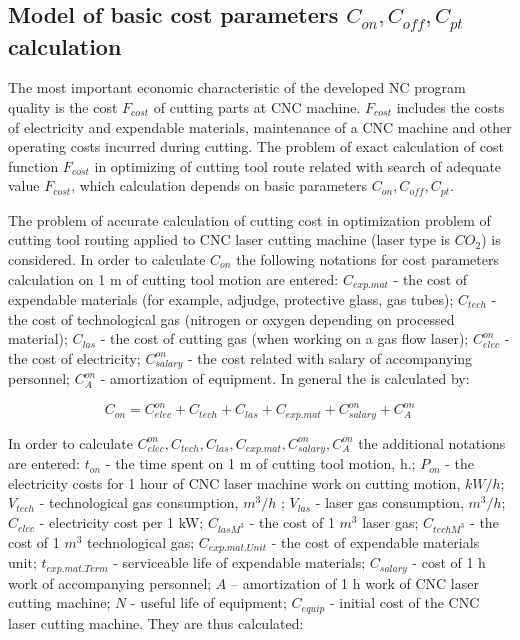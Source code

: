 \documentclass[runningheads]{llncs}
\begin{document}
\subsection{Model of basic cost parameters  $C_{on}, C_{off}, C_{pt}$ calculation}

The most important economic characteristic of the developed NC program quality is the cost $F_{cost}$
of cutting parts at CNC machine.
$F_{cost}$ includes the costs of electricity and expendable materials,
maintenance of a CNC machine and other operating costs incurred during cutting.
The problem of exact calculation of cost function $F_{cost}$
in optimizing of cutting tool route related with search of adequate value  $F_{cost}$,
which calculation depends on basic parameters  $C_{on}, C_{off}, C_{pt}$.

The problem of accurate calculation of cutting cost
in optimization problem of cutting tool routing applied to CNC laser cutting machine
(laser type is $CO_2$)
is considered.
In order to calculate $C_{on}$
the following notations for cost parameters calculation on 1 m of cutting tool motion are entered:
$C_{exp.mat}$ - the cost of expendable materials
(for example, adjudge, protective glass, gas tubes);
$C_{tech}$  - the cost of technological gas
(nitrogen or oxygen depending on processed material);
$C_{las}$ - the cost of cutting gas
(when working on a gas flow laser);
$C^{on}_{elec}$ - the cost of electricity;
$C^{on}_{salary}$ - the cost related with salary of accompanying personnel;
$C^{on}_A$ - amortization of equipment.
In general the  is calculated by:

\begin{equation}
C_{on} =
C^{on}_{elec} + C_{tech} + C_{las} + C_{exp.mat} + C^{on}_{salary} + C^{on}_A
\label{eq1.3}
\end{equation}

In order to calculate
$C^{on}_{elec}, C_{tech}, C_{las}, C_{exp.mat}, C^{on}_{salary}, C^{on}_A$
the additional notations are entered:
$t_{on}$  - the time spent on 1 m of cutting tool motion, h.;
$P_{on}$  - the electricity costs for 1 hour of CNC laser machine work on cutting motion, $kW/h$;
$V_{tech}$  - technological gas consumption, $m^3/h$ ;
$V_{las}$ - laser gas consumption, $m^3/h$;
$C_{elec}$  - electricity cost per 1 kW;
$C_{las M^3}$  - the cost of 1 $m^3$ laser gas;
$C_{tech M^3}$  - the cost of 1 $m^3$ technological gas;
$C_{exp.mat.Unit}$  - the cost of expendable materials unit;
$t_{exp.mat.Term}$  - serviceable life of expendable materials;
$C_{salary}$ - cost of 1 h work of accompanying personnel;
$A$ – amortization of 1 h work of CNC laser cutting machine;
$N$ - useful life of equipment;
$C_{equip}$  - initial cost of the CNC laser cutting machine.
They are thus calculated:
\end{document}

